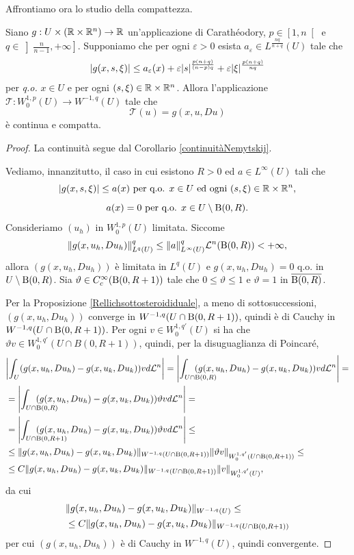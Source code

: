 Affrontiamo ora lo studio della compattezza.

\begin{teorema}\label{compattezzaNemytskij}
Siano $g : U \times (\mathbb{R} \times \mathbb{R}^n) \to \mathbb{R}$ un'applicazione di Carathéodory, $p \in \left[ 1,n\right[$ e $q \in \left] \frac{n}{n-1},+\infty\right] $. Supponiamo che per ogni $\varepsilon>0$ esista $a_\varepsilon \in L^{\frac{nq}{n+q}}(U)$ tale che 
	\[ \lvert g(x,s,\xi)\rvert \le a_\varepsilon(x) + \varepsilon\lvert s\rvert^{\frac{p(n+q)}{(n-p)q}} + \varepsilon \lvert\xi\rvert^{\frac{p(n+q)}{nq}} \]
per \emph{q.o.} $x \in U$ e per ogni $(s,\xi) \in \mathbb{R} \times \mathbb{R}^n$. Allora l’applicazione $\mathcal{T}: W^{1,p}_0(U) \to W^{-1,q}(U)$ tale che
\[ \mathcal{T}(u) = g(x,u,Du) \]
è continua e compatta.
\end{teorema}
\begin{proof}
La continuità segue dal Corollario \eqref{continuitàNemytskij}.

Vediamo, innanzitutto, il caso in cui esistono $R>0$ ed $a \in L^\infty(U)$ tali che 
\[ \lvert g(x,s,\xi)\rvert \le a(x) \textup{ per q.o. } x \in U \textup{ ed ogni } (s,\xi) \in \mathbb{R} \times \mathbb{R}^n, \]
\[ a(x) = 0 \textup{ per q.o. } x \in U \setminus \textup{B}(0,R). \]
Consideriamo $(u_h)$ in $W^{1,p}_0(U)$ limitata. Siccome
\[ \lVert g(x,u_h,Du_h)\rVert^q_{L^q(U)} \le \lVert a\rVert_{L^\infty(U)}^q\mathcal{L}^n(\textup{B}(0,R)) <+\infty, \]
allora $(g(x,u_h,Du_h))$ è limitata in $L^q(U)$ e $g(x,u_h,Du_h) = 0$ q.o. in $U\setminus \textup{B}(0,R)$. Sia $\vartheta \in C^\infty_c(\textup{B}(0,R+1))$ tale che $0\le \vartheta \le 1$ e $\vartheta = 1$ in $\overline{\textup{B}(0,R)}$.

Per la Proposizione \eqref{Rellichsottosteroididuale}, a meno di sottosuccessioni, $(g(x,u_h,Du_h))$ converge in $W^{-1,q}(U \cap \textup{B}(0,R+1))$, quindi è di Cauchy in $W^{-1,q}(U \cap \textup{B}(0,R+1))$. Per ogni $v \in W^{1,q'}_0(U)$ si ha che $\vartheta v \in W^{1,q'}_0(U\cap B(0,R+1))$, quindi, per la disuguaglianza di Poincaré,
\begin{align*}
&\abs*{\int_U (g(x,u_h,Du_h)- g(x,u_k,Du_k))vd\mathcal{L}^n} = \abs*{\int_{U \cap \B(0,R)}\hspace{-25pt} (g(x,u_h,Du_h)- g(x,u_k,Du_k))vd\mathcal{L}^n} = \\
&= \abs*{\int_{U \cap \B(0,R)}\hspace{-25pt} (g(x,u_h,Du_h)- g(x,u_k,Du_k))\vartheta vd\mathcal{L}^n} = \\
&= \abs*{\int_{U \cap \B(0,R+1)}\hspace{-35pt} (g(x,u_h,Du_h)- g(x,u_k,Du_k))\vartheta vd\mathcal{L}^n} \le \\
&\le \norm{g(x,u_h,Du_h)- g(x,u_k,Du_k)}_{W^{-1,q}(U\cap \B(0,R+1))} \norm{\vartheta v}_{W^{1,q'}_0(U\cap \B(0,R+1))} \le \\
&\le C\norm{g(x,u_h,Du_h)- g(x,u_k,Du_k)}_{W^{-1,q}(U\cap \B(0,R+1))}\norm{v}_{W^{1,q'}_0(U)},
\end{align*}
da cui
\begin{align*}
&\lVert g(x,u_h,Du_h)- g(x,u_k,Du_k)\rVert_{W^{-1,q}(U)} \le  \\
&\le C\lVert g(x,u_h,Du_h)- g(x,u_k,Du_k)\rVert_{W^{-1,q}(U\cap \textup{B}(0,R+1))}
\end{align*}
per cui $(g(x,u_h,Du_h))$ è di Cauchy in $W^{-1,q}(U)$, quindi convergente.


\end{proof}
